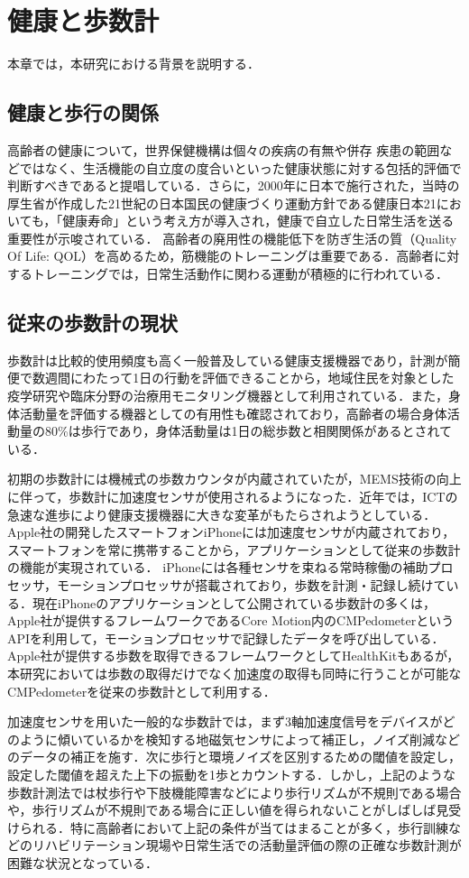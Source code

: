 \chapter{健康と歩数計}
本章では，本研究における背景を説明する．

\section{健康と歩行の関係}
高齢者の健康について，世界保健機構は個々の疾病の有無や併存
疾患の範囲などではなく、生活機能の自立度の度合いといった健康状態に対する包括的評価で判断すべきであると提唱\cite{Who15}している．さらに，2000年に日本で施行された，当時の厚生省が作成した21世紀の日本国民の健康づくり運動方針である健康日本21においても，「健康寿命」という考え方が導入され，健康で自立した日常生活を送る重要性が示唆\cite{Kosei04}されている．
高齢者の廃用性の機能低下を防ぎ生活の質（Quality Of Life: QOL）を高めるため，筋機能のトレーニングは重要である．高齢者に対するトレーニングでは，日常生活動作に関わる運動が積極的に行われている．

\section{従来の歩数計の現状}
歩数計は比較的使用頻度も高く一般普及している健康支援機器であり，計測が簡便で数週間にわたって1日の行動を評価できることから，地域住民を対象とした疫学研究や臨床分野の治療用モニタリング機器として利用されている．また，身体活動量を評価する機器としての有用性も確認されており，高齢者の場合身体活動量の80\%は歩行であり，身体活動量は1日の総歩数と相関関係があるとされている．

初期の歩数計には機械式の歩数カウンタが内蔵されていたが，MEMS技術の向上に伴って，歩数計に加速度センサが使用されるようになった．近年では，ICTの急速な進歩により健康支援機器に大きな変革がもたらされようとしている．Apple社の開発したスマートフォンiPhoneには加速度センサが内蔵されており，スマートフォンを常に携帯することから，アプリケーションとして従来の歩数計の機能が実現されている．
iPhoneには各種センサを束ねる常時稼働の補助プロセッサ，モーションプロセッサが搭載されており，歩数を計測・記録し続けている．現在iPhoneのアプリケーションとして公開されている歩数計の多くは，Apple社が提供するフレームワークであるCore Motion内のCMPedometerというAPIを利用して，モーションプロセッサで記録したデータを呼び出している．Apple社が提供する歩数を取得できるフレームワークとしてHealthKitもあるが，本研究においては歩数の取得だけでなく加速度の取得も同時に行うことが可能なCMPedometerを従来の歩数計として利用する．

加速度センサを用いた一般的な歩数計では，まず3軸加速度信号をデバイスがどのように傾いているかを検知する地磁気センサによって補正し，ノイズ削減などのデータの補正を施す．次に歩行と環境ノイズを区別するための閾値を設定し，設定した閾値を超えた上下の振動を1歩とカウントする．しかし，上記のような歩数計測法では杖歩行や下肢機能障害などにより歩行リズムが不規則である場合や，歩行リズムが不規則である場合に正しい値を得られないことがしばしば見受けられる．特に高齢者において上記の条件が当てはまることが多く，歩行訓練などのリハビリテーション現場や日常生活での活動量評価の際の正確な歩数計測が困難な状況となっている\cite{Sekine07}．
